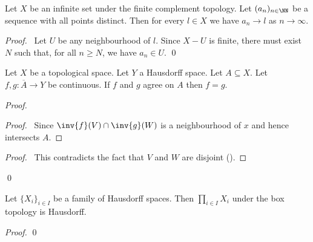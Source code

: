 \begin{proposition}
    Let $X$ be an infinite set under the finite complement topology. Let $(a_n)_{n \in \NN}$ be a sequence
    with all points distinct. Then for every $l \in X$ we have $a_n \rightarrow l$ as
    $n \rightarrow \infty$.
\end{proposition}

\begin{proof}
    \pf\ Let $U$ be any neighbourhood of $l$. Since $X - U$ is finite, there must exist $N$
    such that, for all $n \geq N$, we have $a_n \in U$. \qed
\end{proof}

\begin{proposition}
    \label{proposition:agree_on_closure}
    Let $X$ be a topological space. Let $Y$ a Hausdorff space. Let $A \subseteq X$. Let $f, g : \overline{A} \rightarrow Y$ be continuous.
    If $f$ and $g$ agree on $A$ then $f = g$.
\end{proposition}

\begin{proof}
    \pf
    \begin{proof}
        \pf\ Since $\inv{f}(V) \cap \inv{g}(W)$ is a neighbourhood of $x$ and hence intersects $A$.
    \end{proof}
    \qedstep
    \begin{proof}
        \pf\ This contradicts the fact that $V$ and $W$ are disjoint ().
    \end{proof}
    \qed
\end{proof}

\begin{proposition}
    Let $\{ X_i \}_{i \in I}$ be a family of Hausdorff spaces. Then $\prod_{i \in I} X_i$ under the box topology is Hausdorff.
\end{proposition}

\begin{proof}
    \pf
    \qed
\end{proof}

